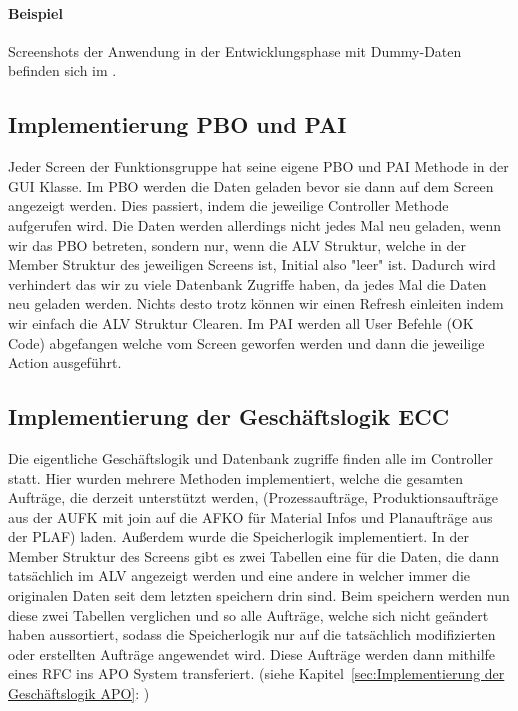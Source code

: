 \paragraph{Beispiel}
Screenshots der Anwendung in der Entwicklungsphase mit Dummy-Daten befinden sich im .

\subsection{Implementierung PBO und PAI}
\label{sec:Implementierung PBO und PAI}
Jeder Screen der Funktionsgruppe hat seine eigene \ac{PBO} und \ac{PAI} Methode in der GUI Klasse. Im PBO werden die Daten geladen bevor sie dann auf dem Screen angezeigt werden. Dies passiert, indem die jeweilige Controller Methode aufgerufen wird. Die Daten werden allerdings nicht jedes Mal neu geladen, wenn wir das \ac{PBO} betreten, sondern nur, wenn die ALV Struktur, welche in der Member Struktur des jeweiligen Screens ist, Initial also "leer" ist. Dadurch wird verhindert das wir zu viele Datenbank Zugriffe haben, da jedes Mal die Daten neu geladen werden. Nichts desto trotz können wir einen Refresh einleiten indem wir einfach die \ac{ALV} Struktur Clearen. Im \ac{PAI} werden all User Befehle (OK Code) abgefangen welche vom Screen geworfen werden und dann die jeweilige Action ausgeführt. 

\subsection{Implementierung der Geschäftslogik ECC}
\label{sec:Implementierung der Geschäftslogik ECC}
Die eigentliche Geschäftslogik und Datenbank zugriffe finden alle im Controller statt. Hier wurden mehrere Methoden implementiert, welche die gesamten Aufträge, die derzeit unterstützt werden, (Prozessaufträge, Produktionsaufträge aus der AUFK mit join auf die AFKO für Material Infos und Planaufträge aus der PLAF) laden. Außerdem wurde die Speicherlogik implementiert. In der Member Struktur des Screens gibt es zwei Tabellen eine für die Daten, die dann tatsächlich im \ac{ALV} angezeigt werden und eine andere in welcher immer die originalen Daten seit dem letzten speichern drin sind. Beim speichern werden nun diese zwei Tabellen verglichen und so alle Aufträge, welche sich nicht geändert haben aussortiert, sodass die Speicherlogik nur auf die tatsächlich modifizierten oder erstellten Aufträge angewendet wird. Diese Aufträge werden dann mithilfe eines RFC ins \ac*{APO} System transferiert. (siehe Kapitel~\ref{sec:Implementierung der Geschäftslogik APO}: )     


